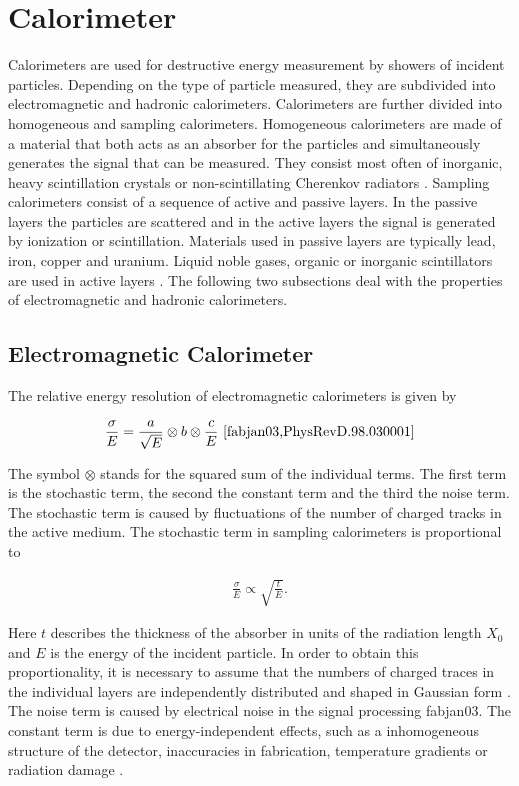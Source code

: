 \documentclass[12pt, a4paper]{thesis}
\begin{document}
\clearpage
\section{Calorimeter}
\label{sec:org937122c}

Calorimeters are used for destructive energy measurement by showers of
incident particles. Depending on the type of particle measured, they
are subdivided into electromagnetic and hadronic
calorimeters. Calorimeters are further divided into homogeneous and
sampling calorimeters. Homogeneous calorimeters are made of a material
that both acts as an absorber for the particles and simultaneously
generates the signal that can be measured. They consist most often of
inorganic, heavy scintillation crystals or non-scintillating Cherenkov
radiators \cite{PhysRevD.98.030001}. Sampling calorimeters consist of
a sequence of active and passive layers. In the passive layers the
particles are scattered and in the active layers the signal is
generated by ionization or scintillation. Materials used in passive
layers are typically lead, iron, copper and uranium. Liquid noble
gases, organic or inorganic scintillators are used in active layers
\cite{PhysRevD.98.030001}. The following two subsections deal with the
properties of electromagnetic and hadronic calorimeters.

\subsection{Electromagnetic Calorimeter}
\label{sec:em-calo}

The relative energy resolution of electromagnetic calorimeters is
given by 

\begin{align}
  \frac{\sigma}{E} = \frac{a}{\sqrt{E}} \otimes b \otimes \frac{c}{E}\ \cite{fabjan03,PhysRevD.98.030001}
\end{align}

The symbol \(\otimes\) stands for the squared sum of the individual
terms. The first term is the stochastic term, the second the constant
term and the third the noise term.  The stochastic term is caused by
fluctuations of the number of charged tracks in the active medium. The
stochastic term in sampling calorimeters is proportional to

\begin{align}
  \frac{\sigma}{E}\propto \sqrt{\frac{t}{E}}.
\end{align}

Here \(t\) describes the thickness of the absorber in units of the
radiation length \(X_0\) and \(E\) is the energy of the incident
particle. In order to obtain this proportionality, it is necessary to
assume that the numbers of charged traces in the individual layers are
independently distributed and shaped in Gaussian form
\cite{amaldi81}. The noise term is caused by electrical noise in the
signal processing {fabjan03}. The constant term is due to
energy-independent effects, such as a inhomogeneous structure of the
detector, inaccuracies in fabrication, temperature gradients or
radiation damage \cite{fabjan03}.
\end{document}
